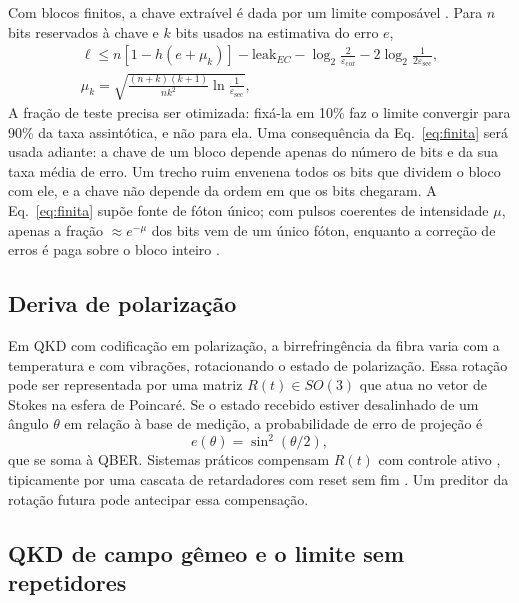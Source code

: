 \documentclass[12pt]{article}
\begin{document}
Com blocos finitos, a chave extraível é dada por um limite composável
\cite{tomamichel2012}. Para $n$ bits reservados à chave e $k$ bits usados
na estimativa do erro $e$,
\begin{gather}
\ell\le n\left[1-h(e+\mu_k)\right]-\mathrm{leak}_{EC}-\log_2\frac{2}{\varepsilon_{\mathrm{cor}}}-2\log_2\frac{1}{2\varepsilon_{\mathrm{sec}}},\nonumber\\
\mu_k=\sqrt{\frac{(n+k)(k+1)}{nk^2}\ln\frac{1}{\varepsilon_{\mathrm{sec}}}},
\label{eq:finita}
\end{gather}
A fração de teste precisa ser otimizada: fixá-la em 10\% faz o limite convergir
para 90\% da taxa assintótica, e não para ela. Uma consequência da
Eq.~\ref{eq:finita} será usada adiante: a chave de um bloco depende apenas do
número de bits e da sua taxa média de erro. Um trecho ruim envenena todos os
bits que dividem o bloco com ele, e a chave não depende da ordem em que os bits
chegaram. A Eq.~\ref{eq:finita} supõe fonte de fóton único; com pulsos
coerentes de intensidade $\mu$, apenas a fração $\approx e^{-\mu}$ dos bits vem
de um único fóton, enquanto a correção de erros é paga sobre o bloco inteiro
\cite{gottesman2004,lim2014}.

\subsection{Deriva de polarização}

Em QKD com codificação em polarização, a birrefringência da fibra varia com a
temperatura e com vibrações, rotacionando o estado de polarização. Essa rotação
pode ser representada por uma matriz $R(t)\in SO(3)$ que atua no vetor de Stokes
na esfera de Poincaré. Se o estado recebido estiver desalinhado de um ângulo
$\theta$ em relação à base de medição, a probabilidade de erro de projeção é
\begin{equation}
e(\theta) = \sin^2(\theta/2),
\label{eq:erro_pol}
\end{equation}
que se soma à QBER. Sistemas práticos compensam $R(t)$ com controle ativo
\cite{xavier2008}, tipicamente por uma cascata de retardadores com reset sem fim
\cite{noe1988}. Um preditor da rotação futura pode antecipar essa compensação.

\subsection{QKD de campo gêmeo e o limite sem repetidores}
\label{sec:fund_tf}
\end{document}
